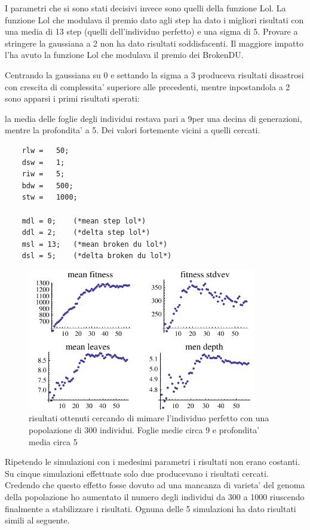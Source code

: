\documentclass[12pt, a4paper]{article}
\begin{document}
I parametri che si sono stati decisivi invece sono quelli della funzione Lol.
La funzione Lol che modulava il premio dato agli step ha dato i migliori risultati con una media di 13 step (quelli dell'individuo perfetto) e una sigma di 5.
Provare a stringere la gaussiana a 2 non ha dato risultati soddisfacenti.
Il maggiore impatto l'ha avuto la funzione Lol che modulava il premio dei BrokenDU.

Centrando la gaussiana su 0 e settando la sigma a 3 produceva risultati disastrosi con crescita di complessita' superiore alle precedenti, mentre inpostandola a 2 sono apparsi i primi risultati sperati:

la media delle foglie degli individui restava pari a 9per una decina di generazioni, mentre la profondita' a 5. Dei valori fortemente vicini a quelli cercati.

\lstset{caption=parametri usati per mimare le caratteristiche dell'individuo perfetto,label=source:mim}
\begin{lstlisting}
	rlw	=	50;
	dsw	=	1;
	riw	=	5;
	bdw	=	500;
	stw	=	1000;

	mdl = 0;	(*mean step lol*) 
	ddl = 2;	(*delta step lol*) 
	msl = 13;	(*mean broken du lol*) 
	dsl = 5;	(*delta broken du lol*) 
\end{lstlisting}
\lstset{caption=,label=}

\begin{figure}[!h]
\begin{center}
\includegraphics[width=10.0cm]{expr5_run4.pdf}
\caption{risultati ottenuti cercando di mimare l'individuo perfetto con una popolazione di 300 individui. Foglie medie circa 9 e profondita' media circa 5} 
\label{figure:expr5run4}
\end{center}
\end{figure}

Ripetendo le simulazioni con i medesimi parametri i risultati non erano costanti. Su cinque simulazioni effettuate solo due producevano i risultati cercati.
Credendo che questo effetto fosse dovuto ad una mancanza di varieta' del genoma della popolazione ho aumentato il numero degli individui da 300 a 1000 riuscendo finalmente a stabilizzare i risultati. Ognuna delle 5 simulazioni ha dato risultati simili al seguente.
\end{document}

